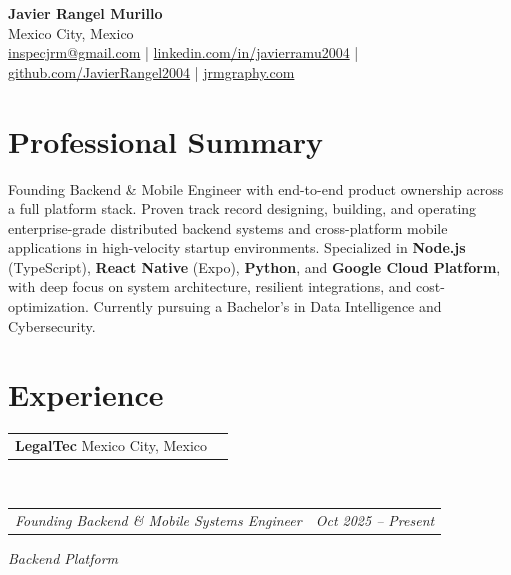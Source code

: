\documentclass[11pt, letterpaper]{article}
\makeatletter
\newcommand{\entry}[2]{%
  \noindent
  \begin{tabular*}{\textwidth}{@{}l@{\extracolsep{\fill}}r@{}}
    #1 & #2
  \end{tabular*}%
}
\newcommand{\job}[4]{%
  \entry{\textbf{#1} \hspace{4pt} #2}{}%
  \\[1pt]%
  \entry{\textit{#3}}{\textit{#4}}%
}
\makeatother
\begin{document}
\pagestyle{empty}

\begin{center}
  {\Huge\bfseries Javier Rangel Murillo}\\[4pt]
  Mexico City, Mexico\\[2pt]
  \href{mailto:inspecjrm@gmail.com}{inspecjrm@gmail.com}
  \enspace|\enspace
  \href{https://linkedin.com/in/javierramu2004}{linkedin.com/in/javierramu2004}
  \enspace|\enspace
  \href{https://github.com/JavierRangel2004}{github.com/JavierRangel2004}
  \enspace|\enspace
  \href{https://jrmgraphy.com}{jrmgraphy.com}
\end{center}

\section{Professional Summary}

Founding Backend \& Mobile Engineer with end-to-end product ownership across
a full platform stack. Proven track record designing, building, and operating
enterprise-grade distributed backend systems and cross-platform mobile
applications in high-velocity startup environments.
Specialized in \textbf{Node.js} (TypeScript), \textbf{React Native} (Expo),
\textbf{Python}, and \textbf{Google Cloud Platform}, with deep focus on
system architecture, resilient integrations, and cost-optimization.
Currently pursuing a Bachelor's in Data Intelligence and Cybersecurity.

\section{Experience}

\job{LegalTec}{Mexico City, Mexico}
    {Founding Backend \& Mobile Systems Engineer}{Oct 2025 -- Present}

\vspace{2pt}
\textit{Backend Platform}
\end{document}
